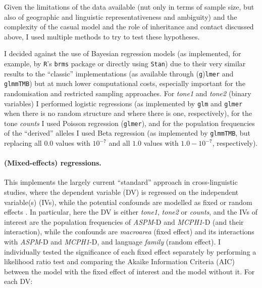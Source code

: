 \documentclass[twoside,onecolumn]{article}
\begin{document}
Given the limitations of the data available (nut only in terms of sample size, but also of geographic and linguistic representativeness and ambiguity) and the complexity of the casual model and the role of inheritance and contact discussed above, I used multiple methods to try to test these hypotheses.

I decided against the use of Bayesian regression models (as implemented, for example, by \texttt{R}'s \texttt{brms} package or directly using \texttt{Stan}) due to their very similar results to the ``classic'' implementations (as available through (\texttt{g})\texttt{lmer} and \texttt{glmmTMB}) but at much lower computational costs, especially important for the randomisation and restricted sampling approaches.
For \textit{tone1} and \textit{tone2} (binary variables) I performed logistic regressions (as implemented by \texttt{glm} and \texttt{glmer} when there is no random structure and where there is one, respectively), for the tone \textit{counts} I used Poisson regression (\texttt{glmer}), and for the population frequencies of the ``derived'' alleles I used Beta regression (as implemented by \texttt{glmmTMB}, but replacing all $0.0$ values with $10^{-7}$ and all $1.0$ values with $1.0 - 10^{-7}$, respectively).

\paragraph{(Mixed-effects) regressions.}

This implements the largely current ``standard'' approach in cross-linguistic studies, where the dependent variable (DV) is regressed on the independent variable(s) (IVs), while the potential confounds are modelled as fixed or random effects \citep{ladd_correlational_2015,jaeger_mixed_2011}.
In particular, here the DV is either \textit{tone1}, \textit{tone2} or \textit{counts}, and the IVs of interest are the population frequencies of \textit{ASPM}-D and \textit{MCPH1}-D (and their interaction), while the confounds are \textit{macroarea} (fixed effect) and its interactions with \textit{ASPM}-D and \textit{MCPH1}-D, and language \textit{family} (random effect).
I individually tested the significance of each fixed effect separately by performing a likelihood ratio test and comparing the Akaike Information Criteria (AIC) between the model with the fixed effect of interest and the model without it.
For each DV:
\end{document}
